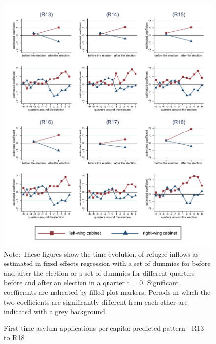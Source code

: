 \documentclass[11pt,a4paper]{scrartcl}
\begin{document}
\clearpage
\FloatBarrier



\clearpage
\FloatBarrier


\clearpage
\FloatBarrier



\clearpage
\FloatBarrier


\clearpage
\FloatBarrier
\begin{figure}[!ht]
	\caption{First-time asylum applications per capita: predicted pattern - R13 to R18}
	\includegraphics[width=1\textwidth]{../results/applications/app_graphs_R13-R18.pdf}
	\scriptsize{Note: These figures show the time evolution of refugee inflows as estimated in fixed effects regression
		with a set of dummies for before and after the election or a set of dummies for different quarters before and after an election in a quarter t = 0. Significant coefficients are indicated by filled plot markers. Periods in which the two coefficients are significantly different from each other are indicated with a grey background.}
\end{figure}
\end{document}
